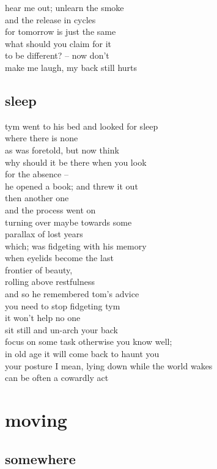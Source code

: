 \documentclass{article}
\begin{document}
hear me out; unlearn the smoke\\
and the release in cycles\\
for tomorrow is just the same\\
what should you claim for it\\
to be different? -- now don't\\
make me laugh, my back still hurts
\clearpage


\subsection{sleep}

tym went to his bed and looked for sleep\\
where there is none\\
as was foretold, but now think\\
why should it be there when you look\\
for the absence --\\
he opened a book; and threw it out\\

then another one\\
and the process went on\\
turning over maybe towards some\\
parallax of lost years\\
which; was fidgeting with his memory\\
when eyelids become the last\\
frontier of beauty,\\
rolling above restfulness\\
and so he remembered tom's advice\\

you need to stop fidgeting tym\\
it won't help no one\\
sit still and un-arch your back\\
focus on some task otherwise you know well;\\
in old age it will come back to haunt you\\
your posture I mean, lying down while the world wakes\\
can be often a cowardly act\\
\clearpage


\section{moving}
\subsection{somewhere}
\end{document}
